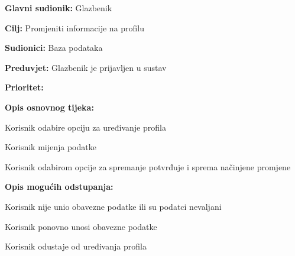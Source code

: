 \noindent {}
	\begin{packed_item}
		
		\item \textbf{Glavni sudionik: } Glazbenik
		\item \textbf{Cilj:} Promjeniti informacije na profilu
		\item \textbf{Sudionici:} Baza podataka
		\item \textbf{Preduvjet:} Glazbenik je prijavljen u sustav
		\item \textbf{Prioritet:} 
		\item \textbf{Opis osnovnog tijeka:}
		
		\item[] \begin{packed_enum}
			\item Korisnik odabire opciju za uređivanje profila 
			\item Korisnik mijenja podatke
			\item Korisnik odabirom opcije za spremanje potvrđuje i sprema načinjene promjene
		\end{packed_enum}
	
		\item  \textbf{Opis mogućih odstupanja:}
		\item[] \begin{packed_item}
			
			\item[3.a] Korisnik nije unio obavezne podatke ili su podatci nevaljani
			\item[] \begin{packed_enum}
				
				\item Korisnik ponovno unosi obavezne podatke
				\item Korisnik odustaje od uređivanja profila
				
			\end{packed_enum}	
		\end{packed_item}
	\end{packed_item}
	
